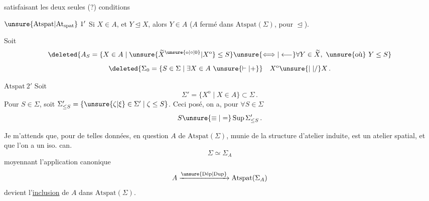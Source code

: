 
satisfaisant les deux seules (?) conditions

\uline{$\unsure{\mathrm{Atspat}|\mathrm{At}_{\mathrm{spat}}}\ 1'$} Si $X\in A$, et $Y\trianglelefteq X$, alors $Y\in A$
($A$ fermé dans $\mathrm{Atspat}(\Sigma)$, pour $\trianglelefteq$).

 Soit
\[
\deleted{A_S=\{X\in A\mid\unsure{\widetilde X^{\unsure{\mathrm{o}|\circ|0}}|X^{\mathrm{o}}}\leq S\}\unsure{\Longleftrightarrow|\longleftarrow}\forall Y\in\widetilde X,\ \unsure{\text{où}}\ Y\leq S}
\]
\[
\deleted{\Sigma_0=\{S\in\Sigma\mid\exists X\in A\ \unsure{\vdash|+}}\quad X^{\mathrm{o}}\unsure{\mid|/}X\,.
\]

\uline{$\mathrm{Atspat}\ 2'$}\quad {} Soit
\[
\Sigma'=\{X^{\mathrm{o}}\mid X\in A\}\subset\Sigma\,.
\]
Pour \deleted{$\unsure{\forall}$} $S\in\Sigma$, soit
$\Sigma'_{\leq S}=\{\unsure{\zeta|\xi}\in\Sigma'\mid\zeta\leq S\}$.
Ceci posé, on a, pour $\forall S\in\Sigma$
\[
S\unsure{\equiv|=}\operatorname{Sup}\Sigma'_{\leq S}\,.
\]

Je m'attends que, pour de telles données,   en question $A$ de $\mathrm{Atspat}(\Sigma)$, munie de la structure d'atelier induite, est un atelier spatial, et que l'on a un iso. can.
\[
\Sigma\simeq\Sigma_A
\]
moyennant l'application canonique
\[
A\xrightarrow{\unsure{\mathrm{D\acute ep}|\mathrm{Dup}}}\mathrm{Atspat}(\Sigma_A)
\]
devient l'\uline{inclusion} de $A$ dans $\mathrm{Atspat}(\Sigma)$.
